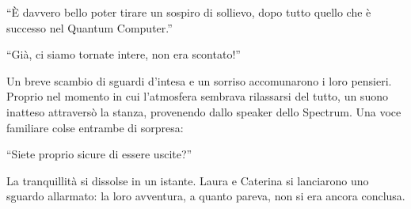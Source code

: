 \begin{dialogue}
 \enquote{È davvero bello poter tirare un sospiro di sollievo, dopo tutto quello che è successo nel Quantum Computer.}
\end{dialogue}

\begin{dialogue}
 \enquote{Già, ci siamo tornate intere, non era scontato!}
\end{dialogue}

Un breve scambio di sguardi d’intesa e un sorriso accomunarono i loro pensieri. Proprio nel momento in cui l’atmosfera sembrava rilassarsi del tutto, un suono inatteso attraversò la stanza, provenendo dallo speaker dello Spectrum. Una voce familiare colse entrambe di sorpresa:

\begin{dialogue}
 \enquote{Siete proprio sicure di essere uscite?}
\end{dialogue}

La tranquillità si dissolse in un istante. Laura e Caterina si lanciarono uno sguardo allarmato: la loro avventura, a quanto pareva, non si era ancora conclusa.
